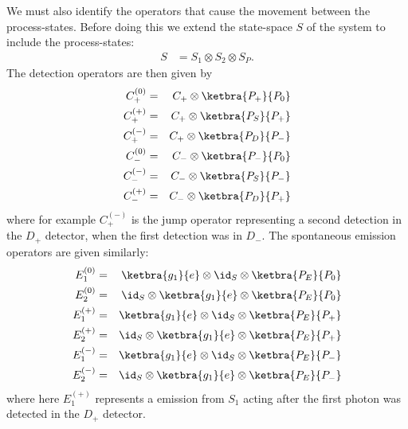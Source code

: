 We must also identify the operators that cause the movement between the process-states. Before doing this we extend the state-space $S$ of the system to include the process-states:
\begin{eqnarray}
  S   &= S_1 \otimes S_2 \otimes S_P.
\end{eqnarray}
The detection operators are then given by
\begin{eqnarray}
  C_{+}^{(0)}  & =& C_{+} \otimes \ketbra{P_+}{P_0}\\
  C_{+}^{(+)} & =& C_{+} \otimes \ketbra{P_S}{P_+}\\
  C_{+}^{(-)} & =& C_{+} \otimes \ketbra{P_D}{P_-}\\
  C_{-}^{(0)}  & =& C_{-} \otimes \ketbra{P_-}{P_0}\\
  C_{-}^{(-)} & =& C_{-} \otimes \ketbra{P_S}{P_-}\\
  C_{-}^{(+)} & =& C_{-} \otimes \ketbra{P_D}{P_+}
\end{eqnarray}
where for example $C_{+}^{(-)}$ is the jump operator representing a second detection in the $D_+$ detector, when the first detection was in $D_-$. The spontaneous emission operators are given similarly:
\begin{eqnarray}
  E_1^{(0)} &=& \ketbra{g_1}{e} \otimes \id_S   \otimes \ketbra{P_E}{P_0}\\
  E_2^{(0)} &=&  \id_S  \otimes \ketbra{g_1}{e} \otimes \ketbra{P_E}{P_0}\\
  E_1^{(+)} &=& \ketbra{g_1}{e} \otimes \id_S   \otimes \ketbra{P_E}{P_+}\\
  E_2^{(+)} &=&  \id_S  \otimes \ketbra{g_1}{e} \otimes \ketbra{P_E}{P_+}\\
  E_1^{(-)} &=& \ketbra{g_1}{e} \otimes \id_S   \otimes \ketbra{P_E}{P_-}\\
  E_2^{(-)} &=&  \id_S  \otimes \ketbra{g_1}{e} \otimes \ketbra{P_E}{P_-}
\end{eqnarray}
where here $E_1^{(+)}$ represents a emission from $S_1$ acting after the first photon was detected in the $D_+$ detector.

